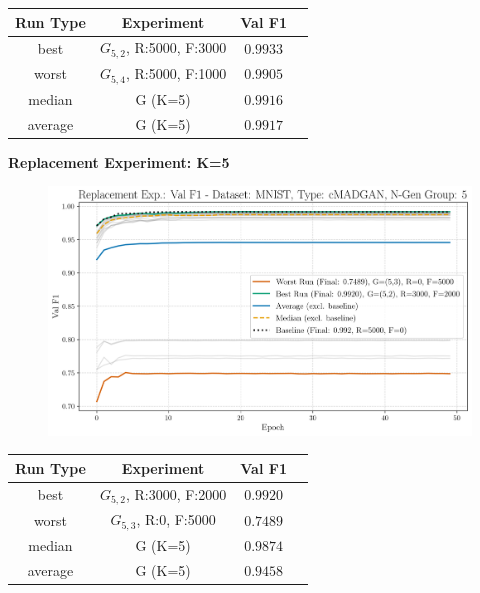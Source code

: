 \begin{table}[H]
	\vspace{-1em}
	\centering
	\begin{tabular}{|c|c|c|c|}
		\hline
		Run Type & Experiment & Val F1 \\ \hline
		best & \(G_{5, 2}\), R:5000, F:3000 & $0.9933$\\ \hline
		worst & \(G_{5, 4}\), R:5000, F:1000 & $0.9905$\\ \hline
		median & G (K=5) & $0.9916$\\ \hline
		average & G (K=5) & $0.9917$
		\\ \hline
	\end{tabular}
\end{table}
\noindent\textbf{Replacement Experiment: K=5}
\begin{figure}[htbp]
	\centering
	\includegraphics[width=.85\textwidth]{abb/strat_classifier_performance/MNIST_STRATIFIED_CLASSIFIERS_cMADGAN_NEW/replacement_experiments/val_f1_score_cMADGAN_MNIST_n_gen_5_all.png}
	\label{fig:app_strat_class_performance_replacement_exp._val_f1_score_5}
\end{figure}
\begin{table}[H]
	\vspace{-1em}
	\centering
	\begin{tabular}{|c|c|c|c|}
		\hline
		Run Type & Experiment & Val F1 \\ \hline
		best & \(G_{5, 2}\), R:3000, F:2000 & $0.9920$\\ \hline
		worst & \(G_{5, 3}\), R:0, F:5000 & $0.7489$\\ \hline
		median & G (K=5) & $0.9874$\\ \hline
		average & G (K=5) & $0.9458$
		\\ \hline
	\end{tabular}
\end{table}
